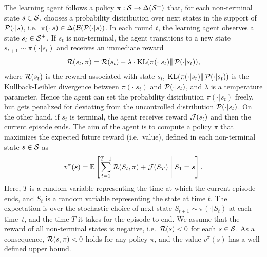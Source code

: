 The learning agent follows a policy $\pi:\mathcal{S}\rightarrow\Delta(\mathcal{S}^+)$ that, for each non-terminal state $s\in\mathcal{S}$, chooses a probability distribution over next states in the support of $\mathcal{P}(\cdot|s)$, i.e.~$\pi(\cdot|s)\in\Delta(\mathcal{B}(\mathcal{P}(\cdot|s))$. In each round $t$, the learning agent observes a state $s_t\in\mathcal{S}^+$. If $s_t$ is non-terminal, the agent transitions to a new state $s_{t+1}\sim\pi(\cdot|s_t)$ and receives an immediate reward
\[
\mathcal{R}(s_t,\pi) = \mathcal{R}(s_t) - \lambda\cdot\mathrm{KL}(\pi(\cdot|s_t)\Vert\, \mathcal{P}(\cdot|s_t)),
\]
where $\mathcal{R}(s_t)$ is the reward associated with state $s_t$, $\mathrm{KL}(\pi(\cdot|s_t)\Vert\, \mathcal{P}(\cdot|s_t))$ is the Kullback-Leibler divergence between $\pi(\cdot|s_t)$ and $\mathcal{P}(\cdot|s_t)$, and $\lambda$ is a temperature parameter. Hence the agent can set the probability distribution $\pi(\cdot|s_t)$ freely, but gets penalized for deviating from the uncontrolled distribution $\mathcal{P}(\cdot|s_t)$. On the other hand, if $s_t$ is terminal, the agent receives reward $\mathcal{J}(s_t)$ and then the current episode ends. The aim of the agent is to compute a policy $\pi$ that maximizes the expected future reward (i.e.~value), defined in each non-terminal state $s\in\mathcal{S}$ as
\[
v^\pi(s) = \mathbb{E}\left[\sum_{t=1}^{T-1} \mathcal{R}(S_t,\pi) + \mathcal{J}(S_T)\;\middle\lvert\;S_1 = s\right].
\]
Here, $T$ is a random variable representing the time at which the current episode ends, and $S_t$ is a random variable representing the state at time $t$. The expectation is over the stochastic choice of next state $S_{t+1}\sim\pi(\cdot|S_t)$ at each time~$t$, and the time $T$ it takes for the episode to end. We assume that the reward of all non-terminal states is negative, i.e.~$\mathcal{R}(s)<0$ for each $s\in\mathcal{S}$. As a consequence, $\mathcal{R}(s,\pi)<0$ holds for any policy $\pi$, and the value $v^\pi(s)$ has a well-defined upper bound. %

